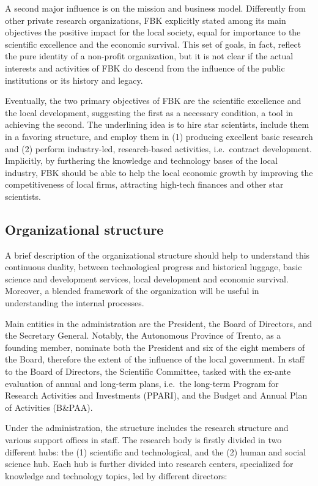 A second major influence is on the mission and business model. Differently from other private research organizations, FBK explicitly stated among its main objectives the positive impact for the local society, equal for importance to the scientific excellence and the economic survival. This set of goals, in fact, reflect the pure identity of a non-profit organization, but it is not clear if the actual interests and activities of FBK do descend from the influence of the public institutions or its history and legacy.

Eventually, the two primary objectives of FBK are the scientific excellence and the local development, suggesting the first as a necessary condition, a tool in achieving the second. The underlining idea is to hire star scientists, include them in a favoring structure, and employ them in (1) producing excellent basic research and (2) perform industry-led, research-based activities, i.e.\ contract development. Implicitly, by furthering the knowledge and technology bases of the local industry, FBK should be able to help the local economic growth by improving the competitiveness of local firms, attracting high-tech finances and other star scientists.

\subsection{Organizational structure}

A brief description of the organizational structure should help to understand this continuous duality, between technological progress and historical luggage, basic science and development services, local development and economic survival. Moreover, a blended framework of the organization will be useful in understanding the internal processes. 

Main entities in the administration are the President, the Board of Directors, and the Secretary General. Notably, the Autonomous Province of Trento, as a founding member, nominate both the President and six of the eight members of the Board, therefore the extent of the influence of the local government. In staff to the Board of Directors, the Scientific Committee, tasked with the ex-ante evaluation of annual and long-term plans, i.e.\ the long-term Program for Research Activities and Investments (PPARI), and the Budget and Annual Plan of Activities (B\&PAA).

Under the administration, the structure includes the research structure and various support offices in staff. The research body is firstly divided in two different hubs: the (1) scientific and technological, and the (2) human and social science hub. Each hub is further divided into research centers, specialized for knowledge and technology topics, led by different directors:

